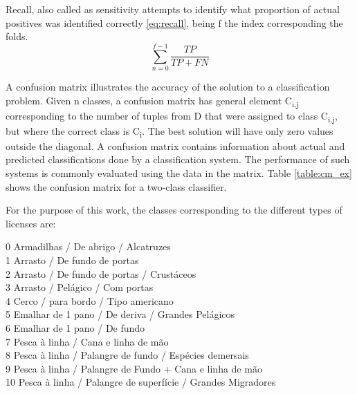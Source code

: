 Recall, also called as sensitivity attempts to identify what proportion of actual positives was identified correctly \ref{eq:recall}, being f the index corresponding the folds. \\
\begin{equation}
\sum_{n=0}^{f-1}\frac{TP}{TP+FN} 
\label{eq:recall}
\end{equation}




A confusion matrix \cite{CMPatil} illustrates the accuracy of the solution to a classification problem. Given n classes, a confusion matrix has general element C\textsubscript{i,j} corresponding to the number of tuples from D that were assigned to class C\textsubscript{i,j}, but where the correct class is C\textsubscript{i}.
The best solution will have only zero values outside the diagonal.
A confusion matrix contains information about actual and predicted classifications done by a classification system. The performance of such systems is commonly evaluated using the data in the matrix. Table \ref{table:cm_ex} shows the confusion matrix for a two-class classifier. 

For the purpose of this work, the classes corresponding to the different types of licenses are: 

0 Armadilhas / De abrigo / Alcatruzes \\
1 Arrasto / De fundo de portas \\
2 Arrasto / De fundo de portas / Crustáceos\\
3 Arrasto / Pelágico / Com portas\\
4 Cerco / para bordo / Tipo americano\\
5 Emalhar de 1 pano / De deriva / Grandes Pelágicos\\
6 Emalhar de 1 pano / De fundo\\
7 Pesca à linha / Cana e linha de mão\\
8 Pesca à linha / Palangre de fundo / Espécies demersais\\
9 Pesca à linha / Palangre de Fundo + Cana e linha de mão\\
10 Pesca à linha / Palangre de superfície / Grandes Migradores



